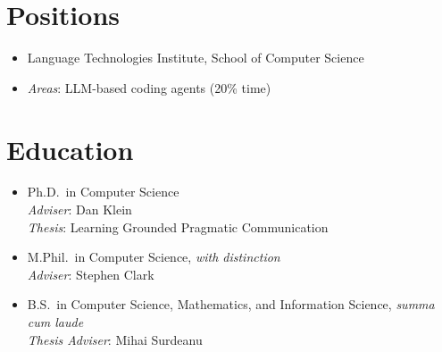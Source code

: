 \section{Positions}
\begin{itemize}[leftmargin=-0.4mm,partopsep=0pt,label=]
  \item {}
    Language Technologies Institute, School of Computer Science

  \item {}
    \emph{Areas}: LLM-based coding agents (20\% time)
\end{itemize}
\vspace{-0.5em}

\section{Education}
\begin{itemize}[leftmargin=-0.4mm,partopsep=0pt,label=]
  \item {}
    Ph.D.\ in Computer Science \\
    \emph{Adviser}: Dan Klein \\
    \emph{Thesis}: Learning Grounded Pragmatic Communication

  \item {}
    M.Phil.\ in Computer Science, \emph{with distinction} \\
    \emph{Adviser}: Stephen Clark

  \item {}
    B.S.\ in Computer Science, Mathematics, and Information Science, \emph{summa cum laude} \\
    \emph{Thesis Adviser}: Mihai Surdeanu
\end{itemize}
\vspace{-0.5em}

